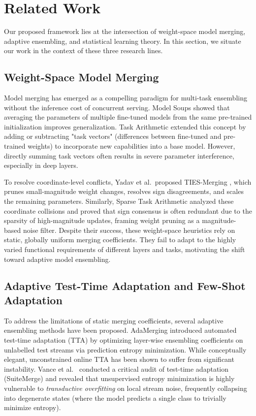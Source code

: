 \section{Related Work}
\label{sec:related_work}

Our proposed framework lies at the intersection of weight-space model merging, adaptive ensembling, and statistical learning theory. In this section, we situate our work in the context of these three research lines.

\subsection{Weight-Space Model Merging}
Model merging has emerged as a compelling paradigm for multi-task ensembling without the inference cost of concurrent serving. Model Soups \cite{wortsman2022model} showed that averaging the parameters of multiple fine-tuned models from the same pre-trained initialization improves generalization. Task Arithmetic \cite{ilharco2022editing} extended this concept by adding or subtracting "task vectors" (differences between fine-tuned and pre-trained weights) to incorporate new capabilities into a base model. However, directly summing task vectors often results in severe parameter interference, especially in deep layers. 

To resolve coordinate-level conflicts, Yadav et al.\ proposed TIES-Merging \cite{yadav2023ties}, which prunes small-magnitude weight changes, resolves sign disagreements, and scales the remaining parameters. Similarly, Sparse Task Arithmetic \cite{drago2024sparse} analyzed these coordinate collisions and proved that sign consensus is often redundant due to the sparsity of high-magnitude updates, framing weight pruning as a magnitude-based noise filter. Despite their success, these weight-space heuristics rely on static, globally uniform merging coefficients. They fail to adapt to the highly varied functional requirements of different layers and tasks, motivating the shift toward adaptive model ensembling.

\subsection{Adaptive Test-Time Adaptation and Few-Shot Adaptation}
To address the limitations of static merging coefficients, several adaptive ensembling methods have been proposed. AdaMerging \cite{yang2023adamerging} introduced automated test-time adaptation (TTA) by optimizing layer-wise ensembling coefficients on unlabelled test streams via prediction entropy minimization. While conceptually elegant, unconstrained online TTA has been shown to suffer from significant instability. Vance et al.\ \cite{suitemerge2025} conducted a critical audit of test-time adaptation (SuiteMerge) and revealed that unsupervised entropy minimization is highly vulnerable to \emph{transductive overfitting} on local stream noise, frequently collapsing into degenerate states (where the model predicts a single class to trivially minimize entropy).

